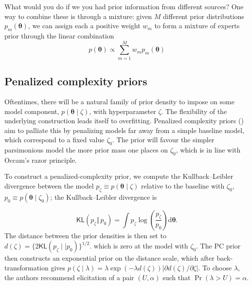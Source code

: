 \documentclass[
  11pt,
  letterpaper,
]{scrbook}
\theoremstyle{definition}
\theoremstyle{plain}
\theoremstyle{plain}
\theoremstyle{definition}
\theoremstyle{definition}
\theoremstyle{remark}
\begin{document}
What would you do if we you had prior information from different
sources? One way to combine these is through a mixture: given \(M\)
different prior distributions \(p_m(\boldsymbol{\theta})\), we can
assign each a positive weight \(w_m\) to form a mixture of experts prior
through the linear combination
\[ p(\boldsymbol{\theta}) \propto \sum_{m=1}^M w_m p_m(\boldsymbol{\theta})\]

\subsection{Penalized complexity
priors}\label{penalized-complexity-priors}

Oftentimes, there will be a natural family of prior density to impose on
some model component, \(p(\boldsymbol{\theta} \mid \zeta)\), with
hyperparameter \(\zeta\). The flexibility of the underlying construction
leads itself to overfitting. Penalized complexity priors
() aim to palliate this
by penalizing models far away from a simple baseline model, which
correspond to a fixed value \(\zeta_0\). The prior will favour the
simpler parsimonious model the more prior mass one places on
\(\zeta_0\), which is in line with Occam's razor principle.

To construct a penalized-complexity prior, we compute the
Kullback--Leibler divergence between the model
\(p_\zeta \equiv p(\boldsymbol{\theta} \mid \zeta)\) relative to the
baseline with \(\zeta_0\), \(p_0 \equiv p(\boldsymbol{\theta} \mid
\zeta_0)\); the Kullback--Leibler divergence is

\[
\mathsf{KL}(p_\zeta \Vert\, p_0)=\int p_\zeta \log\left(\frac{p_\zeta}{p_0}\right) \mathrm{d} \boldsymbol{\theta}.
\] The distance between the prior densities is then set to
\(d(\zeta) = \{2\mathsf{KL}(p_\zeta \mid\mid p_0)\}^{1/2}\). which is
zero at the model with \(\zeta_0\). The PC prior then constructs an
exponential prior on the distance scale, which after back-transformation
gives
\(p(\zeta \mid \lambda) = \lambda\exp(-\lambda d(\zeta)) \left| {\partial d(\zeta)}/{\partial \zeta}\right|\).
To choose \(\lambda\), the authors recommend elicitation of a pair
\((U, \alpha)\) such that \(\Pr(\lambda > U)=\alpha\).
\end{document}
